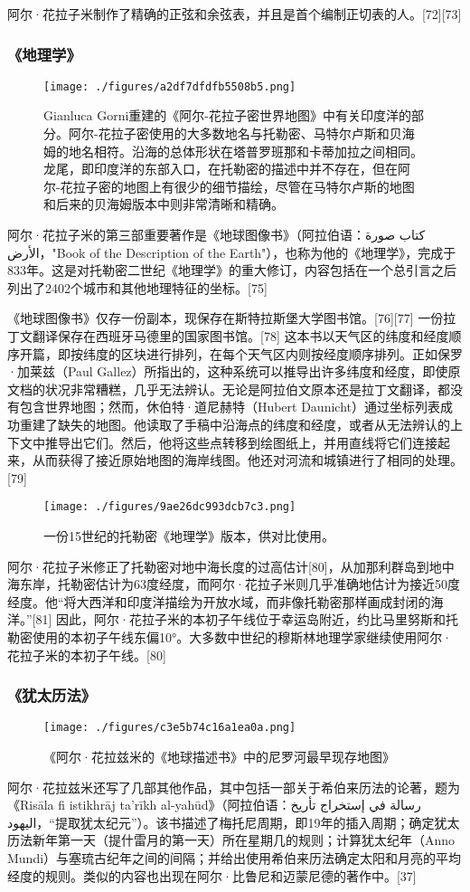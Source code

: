阿尔·花拉子米制作了精确的正弦和余弦表，并且是首个编制正切表的人。[72][73]
\subsubsection{《地理学》}
\begin{figure}[ht]
\centering
\texttt{[image: ./figures/a2df7dfdfb5508b5.png]}
\caption{Gianluca Gorni重建的《阿尔-花拉子密世界地图》中有关印度洋的部分。阿尔-花拉子密使用的大多数地名与托勒密、马特尔卢斯和贝海姆的地名相符。沿海的总体形状在塔普罗班那和卡蒂加拉之间相同。龙尾，即印度洋的东部入口，在托勒密的描述中并不存在，但在阿尔-花拉子密的地图上有很少的细节描绘，尽管在马特尔卢斯的地图和后来的贝海姆版本中则非常清晰和精确。} \label{fig_HLZM_9}
\end{figure}
阿尔·花拉子米的第三部重要著作是《地球图像书》（阿拉伯语：كتاب صورة الأرض，"Book of the Description of the Earth"），也称为他的《地理学》，完成于833年。这是对托勒密二世纪《地理学》的重大修订，内容包括在一个总引言之后列出了2402个城市和其他地理特征的坐标。[75]

《地球图像书》仅存一份副本，现保存在斯特拉斯堡大学图书馆。[76][77] 一份拉丁文翻译保存在西班牙马德里的国家图书馆。[78] 这本书以天气区的纬度和经度顺序开篇，即按纬度的区块进行排列，在每个天气区内则按经度顺序排列。正如保罗·加莱兹（Paul Gallez）所指出的，这种系统可以推导出许多纬度和经度，即使原文档的状况非常糟糕，几乎无法辨认。无论是阿拉伯文原本还是拉丁文翻译，都没有包含世界地图；然而，休伯特·道尼赫特（Hubert Daunicht）通过坐标列表成功重建了缺失的地图。他读取了手稿中沿海点的纬度和经度，或者从无法辨认的上下文中推导出它们。然后，他将这些点转移到绘图纸上，并用直线将它们连接起来，从而获得了接近原始地图的海岸线图。他还对河流和城镇进行了相同的处理。[79]
\begin{figure}[ht]
\centering
\texttt{[image: ./figures/9ae26dc993dcb7c3.png]}
\caption{一份15世纪的托勒密《地理学》版本，供对比使用。} \label{fig_HLZM_10}
\end{figure}
阿尔·花拉子米修正了托勒密对地中海长度的过高估计[80]，从加那利群岛到地中海东岸，托勒密估计为63度经度，而阿尔·花拉子米则几乎准确地估计为接近50度经度。他“将大西洋和印度洋描绘为开放水域，而非像托勒密那样画成封闭的海洋。”[81] 因此，阿尔·花拉子米的本初子午线位于幸运岛附近，约比马里努斯和托勒密使用的本初子午线东偏10°。大多数中世纪的穆斯林地理学家继续使用阿尔·花拉子米的本初子午线。[80]
\subsubsection{《犹太历法》}  
\begin{figure}[ht]
\centering
\texttt{[image: ./figures/c3e5b74c16a1ea0a.png]}
\caption{《阿尔·花拉兹米的《地球描述书》中的尼罗河最早现存地图》} \label{fig_HLZM_11}
\end{figure}
阿尔·花拉兹米还写了几部其他作品，其中包括一部关于希伯来历法的论著，题为《Risāla fi istikhrāj ta'rīkh al-yahūd》（阿拉伯语：رسالة في إستخراج تأريخ اليهود，“提取犹太纪元”）。该书描述了梅托尼周期，即19年的插入周期；确定犹太历法新年第一天（提什雷月的第一天）所在星期几的规则；计算犹太纪年（Anno Mundi）与塞琉古纪年之间的间隔；并给出使用希伯来历法确定太阳和月亮的平均经度的规则。类似的内容也出现在阿尔·比鲁尼和迈蒙尼德的著作中。[37]
